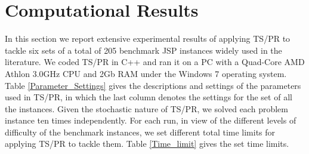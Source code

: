 \documentclass[authoryear,12pt]{elsarticle}
\begin{document}
\section{Computational Results}
\label{sec results Experiment3}


In this section we report extensive experimental results of applying TS/PR to tackle six sets of a total of 205 benchmark JSP instances widely used in the literature. We coded TS/PR in C++ and ran it on a PC with a Quad-Core AMD Athlon 3.0GHz CPU and 2Gb RAM under the Windows 7 operating system. Table \ref{Parameter_Settings} gives the descriptions and settings of the parameters used in TS/PR, in which the last column denotes the settings for the set of all the instances. Given the stochastic nature of TS/PR, we solved each problem instance ten times independently. For each run, in view of the different levels of difficulty of the benchmark instances, we set different total time limits for applying TS/PR to tackle them. Table \ref{Time_limit} gives the set time limits.

\begin{table}[!h]
\begin{scriptsize}
\caption{The settings of some important parameters in TS/PR}
\label{Parameter_Settings}
\end{scriptsize}
\end{table}
\end{document}
